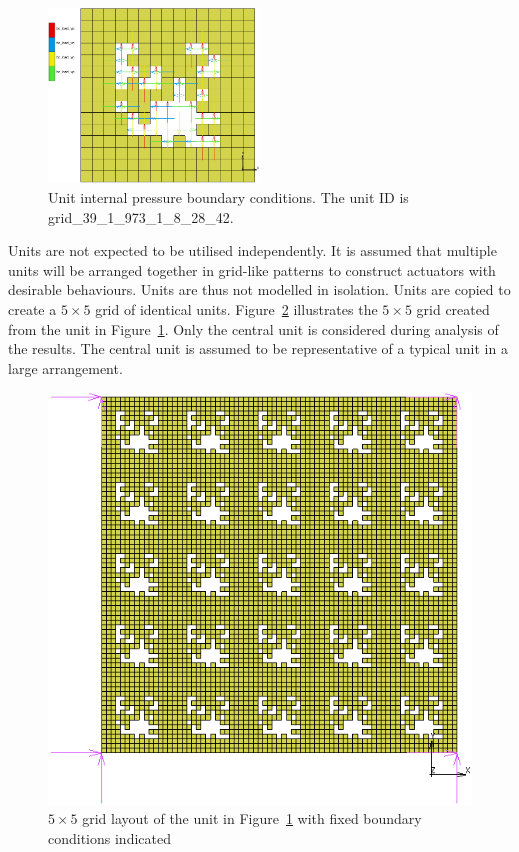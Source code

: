 \begin{figure}[H]
	\centering
	\includegraphics[width=0.5\textwidth]{5x5Single.png}
	\caption[Unit internal pressure boundary conditions]{Unit internal pressure boundary conditions. The unit ID is grid\_39\_1\_973\_1\_8\_28\_42.}
	\label{fig:uip}
\end{figure}

Units are not expected to be utilised independently. It is assumed that multiple units will be arranged together in grid-like patterns to construct actuators with desirable behaviours. Units are thus not modelled in isolation. Units are copied to create a $5\times 5$ grid of identical units. Figure~\ref{fig:5x5grid} illustrates the $5\times 5$ grid created from the unit in Figure~\ref{fig:uip}. Only the central unit is considered during analysis of the results. The central unit is assumed to be representative of a typical unit in a large arrangement.

\begin{figure}[H]
	\centering
	\includegraphics[width=\textwidth]{5x5Layout.png}
	\caption[$5\times 5$ grid layout with fixed boundary conditions indicated]{$5\times 5$ grid layout of the unit in Figure~\ref{fig:uip} with fixed boundary conditions indicated}
	\label{fig:5x5grid}
\end{figure}

